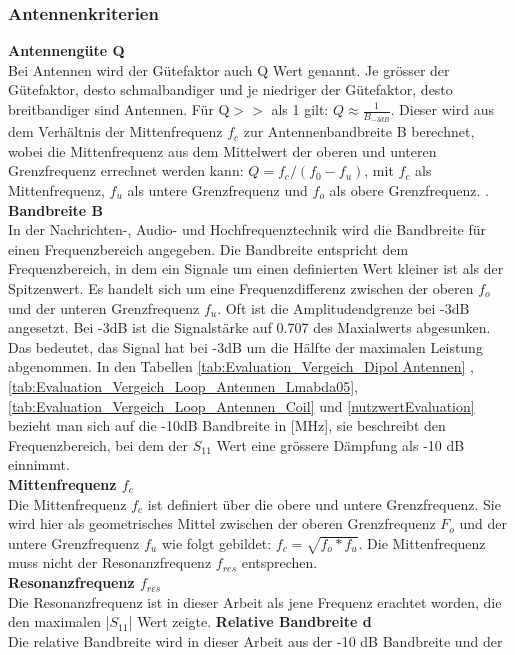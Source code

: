 \subsubsection{Antennenkriterien}
\textbf{Antennengüte Q}\\
Bei Antennen wird der Gütefaktor auch Q Wert genannt. Je grösser der Gütefaktor, desto schmalbandiger und je niedriger der Gütefaktor, desto breitbandiger sind Antennen. Für Q$>>$ als 1 gilt: $Q \approx\frac{1}{B_{-3dB}}$. Dieser wird aus dem Verhältnis der Mittenfrequenz $f_{c}$ zur Antennenbandbreite B berechnet, wobei die Mittenfrequenz aus dem Mittelwert der oberen und unteren Grenzfrequenz errechnet werden kann: $Q = f_c/(f_0-f_u)$, mit $f_c$ als Mittenfrequenz, $f_u$ als untere Grenzfrequenz und $f_o$ als obere Grenzfrequenz. \cite{Guetefaktor_Q}.\\
\textbf{Bandbreite B}\\
In der Nachrichten-, Audio- und Hochfrequenztechnik wird die Bandbreite für einen Frequenzbereich angegeben. Die Bandbreite entspricht dem Frequenzbereich, in dem ein Signale um einen definierten Wert kleiner ist als der Spitzenwert. Es handelt sich um eine Frequenzdifferenz zwischen der oberen $f_o$ und der unteren Grenzfrequenz $f_u$. Oft ist die Amplitudendgrenze bei -3dB angesetzt. Bei -3dB ist die Signalstärke auf 0.707 des Maxialwerts abgesunken. Das bedeutet, das Signal hat bei -3dB um die Hälfte der maximalen Leistung abgenommen\cite{Bandbreite_B}.
In den Tabellen \ref{tab:Evaluation_Vergeich_Dipol Antennen} ,\ref{tab:Evaluation_Vergeich_Loop_Antennen_Lmabda05}, \ref{tab:Evaluation_Vergeich_Loop_Antennen_Coil} und \ref{nutzwertEvaluation} bezieht man sich auf die -10dB Bandbreite in [MHz], sie beschreibt den Frequenzbereich, bei dem der $S_{11}$ Wert eine grössere Dämpfung als -10 dB einnimmt.\\
\textbf{Mittenfrequenz $f_{c}$}\\
Die Mittenfrequenz $f_c$ ist definiert über die obere und untere Grenzfrequenz. Sie wird hier als geometrisches Mittel zwischen der oberen Grenzfrequenz $F_o$ und der untere Grenzfrequenz $f_u$ wie folgt gebildet: $f_c=\sqrt{f_o*f_u}$. Die Mittenfrequenz muss nicht der Resonanzfrequenz $f_{res}$ entsprechen.\\
\textbf{Resonanzfrequenz $f_{res}$}\\
Die Resonanzfrequenz ist in dieser Arbeit als jene Frequenz erachtet worden, die den maximalen |$S_{11}$| Wert zeigte.
\textbf{Relative Bandbreite d}\\
Die relative Bandbreite wird in dieser Arbeit aus der -10 dB Bandbreite und der  
